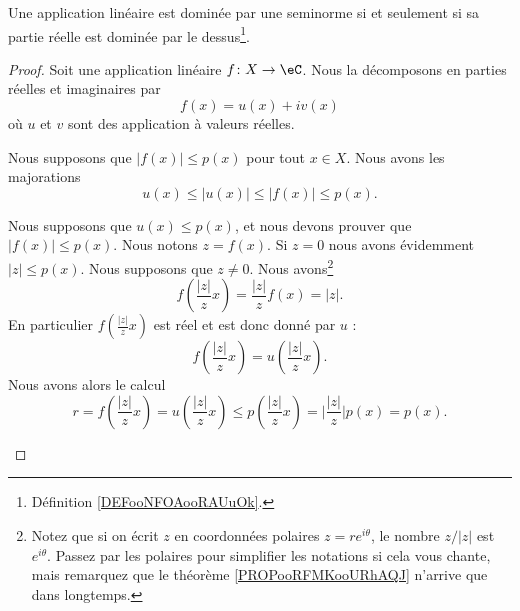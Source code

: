 \begin{lemma}		\label{LEMooKTSKooIteFGq}
	Une application linéaire est dominée par une seminorme si et seulement si sa partie réelle est dominée par le dessus\footnote{Définition \ref{DEFooNFOAooRAUuOk}.}.
\end{lemma}

\begin{proof}
	Soit une application linéaire \(f \colon X\to \eC  \). Nous la décomposons en parties réelles et imaginaires par
	\begin{equation}
		f(x)=u(x)+iv(x)
	\end{equation}
	où \( u\) et \( v\) sont des application à valeurs réelles.

	\begin{subproof}
		\spitem[\( \Rightarrow\)]
		Nous supposons que \( | f(x) |\leq p(x)\) pour tout \( x\in X\). Nous avons les majorations
		\begin{equation}
			u(x)\leq | u(x) |\leq | f(x) |\leq p(x).
		\end{equation}

		\spitem[\( \Leftarrow\)]
		Nous supposons que \( u(x)\leq p(x)\), et nous devons prouver que \( | f(x) |\leq p(x)\). Nous notons \( z=f(x)\). Si \( z=0\) nous avons évidemment \( | z |\leq p(x)\). Nous supposons que \( z\neq 0\). Nous avons\footnote{Notez que si on écrit \( z\) en coordonnées polaires \( z=re^{i\theta}\), le nombre \( z/| z |\) est \( e^{i\theta}\). Passez par les polaires pour simplifier les notations si cela vous chante, mais remarquez que le théorème \ref{PROPooRFMKooURhAQJ} n'arrive que dans longtemps.}
		\begin{equation}
			f(\frac{ | z | }{ z }x)=\frac{ | z | }{ z }f(x)=| z |.
		\end{equation}
		En particulier \( f(\frac{ | z | }{ z }x)\) est réel et est donc donné par \( u\) :
		\begin{equation}
			f(\frac{ | z | }{ z }x)=u(\frac{ | z | }{ z }x).
		\end{equation}
		Nous avons alors le calcul
		\begin{equation}
			r=f(\frac{ | z | }{ z }x)=u(\frac{ | z | }{ z }x)\leq p(\frac{ | z | }{ z }x)=\big| \frac{ | z | }{ z }\big|p(x) =p(x).
		\end{equation}
	\end{subproof}
\end{proof}


